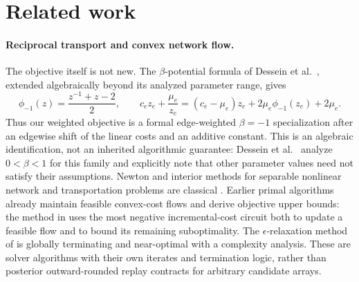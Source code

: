 \documentclass[smallextended,envcountsect]{svjour3}
\begin{document}


\section{Related work}
\label{sec:related}

\paragraph{Reciprocal transport and convex network flow.}
The objective itself is not new.  The $\beta$-potential formula of
Dessein et al.\ \citep{dessein2018rot}, extended algebraically beyond its analyzed parameter
range, gives
\[
 \phi_{-1}(z)=\frac{z^{-1}+z-2}{2},\qquad
 c_ez_e+\frac{\mu_e}{z_e}
 =(c_e-\mu_e)z_e+2\mu_e\phi_{-1}(z_e)+2\mu_e.
\]
Thus our weighted objective is a formal edge-weighted $\beta=-1$
specialization after an edgewise shift of the linear costs and an additive
constant.  This is an algebraic identification, not an inherited algorithmic
guarantee: Dessein et al.\ \citep{dessein2018rot} analyze $0<\beta<1$ for this family and
explicitly note that other parameter values need not satisfy their assumptions.
Newton and interior methods for separable nonlinear network and transportation
 problems are classical
 \citep{klincewicz1983,klincewicz1989,katsura1989interior,ibaraki1991dual}.
 Earlier primal algorithms already maintain feasible convex-cost flows and
 derive objective upper bounds: the method in \citep{weintraub1974primal} uses the most
 negative incremental-cost circuit both to update a feasible flow and to bound
 its remaining suboptimality.  The $\epsilon$-relaxation method of
 \citep{bertsekas1997epsilon} is globally terminating and near-optimal
 with a complexity analysis.  These are solver algorithms with their own
 iterates and termination logic, rather than posterior outward-rounded replay
 contracts for arbitrary candidate arrays.
\end{document}
